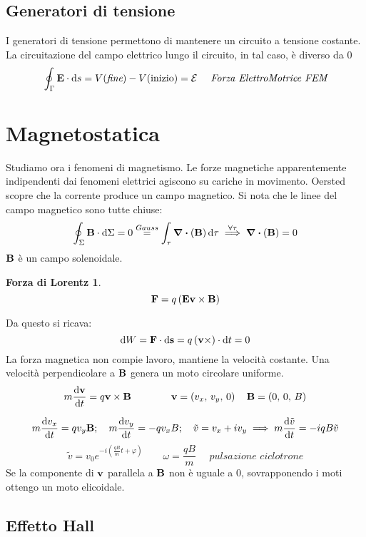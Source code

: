 \documentclass[12pt,a4paper]{article}
\begin{document}
\subsection{Generatori di tensione}
I generatori di tensione permettono di mantenere un circuito a tensione costante.
La circuitazione del campo elettrico lungo il circuito, in tal caso, è diverso da 0
\begin{equation*}
    \oint_\Gamma \vb{E}\cdot\dd{s}= V(\textit{fine})-V(\text{inizio}) = \mathcal{E}\quad \textit{      Forza ElettroMotrice FEM}
\end{equation*} 



\section{Magnetostatica}
Studiamo ora i fenomeni di magnetismo. Le forze magnetiche apparentemente indipendenti dai fenomeni elettrici agiscono su cariche in movimento.
Oersted scopre che la corrente produce un campo magnetico.
Si nota che le linee del campo magnetico sono tutte chiuse:
\begin{equation*}
    \oint_\Sigma \vb{B}\cdot\dd{\Sigma} = 0 \overset{Gauss}{=} \int_\tau \div(\vb{B}) \dd{\tau} \overset{\forall \tau}{\implies} \div(\vb{B})= 0
\end{equation*}
$\vb{B}$ è un campo solenoidale.

\newtheorem*{FL}{Forza di Lorentz}
\begin{FL}
    \begin{equation*}
        \vb{F}= q \left( \vb{E} \vb{v}\times \vb{B} \right)
    \end{equation*}
\end{FL}

Da questo si ricava:
\begin{equation*}
    \dd{W}= \vb{F}\cdot\dd{\vb{s}}= q\left( \vb{v}\times \right) \cdot \dd{t} = 0
\end{equation*}
La forza magnetica non compie lavoro, mantiene la velocità costante.
Una velocità perpendicolare a $\vb{B}$ genera un moto circolare uniforme.
\begin{equation*}
    m\dv{\vb{v}}{t}= q\vb{v}\times \vb{B}\qquad\qquad \vb{v}= \left( v_x,\,v_y,\,0 \right)\quad \vb{B}= \left( 0,\,0,\,B \right)
\end{equation*}

\begin{equation*}
    m\dv{v_x}{t}=qv_y\vb{B}; \quad m\dv{v_y}{t}= -qv_xB; \quad\tilde{v}= v_x + iv_y \implies m\dv{\tilde{v}}{t}= -iqB\tilde{v}
\end{equation*}
\begin{equation*}
    \tilde{v}= v_0e^{-i\left( \frac{qB}{m}t+\varphi \right)} \qquad \omega= \frac{qB}{m}\quad \textit{ pulsazione ciclotrone}
\end{equation*}
Se la componente di $\vb{v}$ parallela a $\vb{B}$ non è uguale a 0, sovrapponendo i moti ottengo un moto elicoidale.

\subsection{Effetto Hall}
\end{document}
